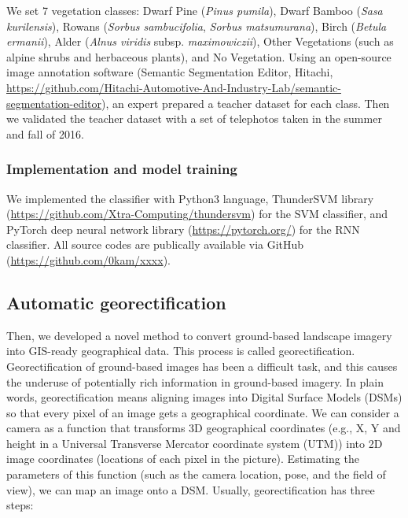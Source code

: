 \documentclass{article}
\begin{document}
We set 7 vegetation classes: Dwarf Pine (\emph{Pinus pumila}), Dwarf Bamboo (\emph{Sasa kurilensis}), Rowans (\emph{Sorbus sambucifolia}, \emph{Sorbus matsumurana}), Birch (\emph{Betula ermanii}), Alder (\emph{Alnus viridis} subsp. \emph{maximowiczii}), Other Vegetations (such as alpine shrubs and herbaceous plants), and No Vegetation. Using an open-source image annotation software (Semantic Segmentation Editor, Hitachi, \url{https://github.com/Hitachi-Automotive-And-Industry-Lab/semantic-segmentation-editor}), an expert prepared a teacher dataset for each class. Then we validated the teacher dataset with a set of telephotos taken in the summer and fall of 2016.

\hypertarget{implementation-and-model-training}{%
\subsubsection{Implementation and model training}\label{implementation-and-model-training}}

We implemented the classifier with Python3 language, ThunderSVM library (\url{https://github.com/Xtra-Computing/thundersvm}) for the SVM classifier, and PyTorch deep neural network library (\url{https://pytorch.org/}) for the RNN classifier. All source codes are publically available via GitHub (\url{https://github.com/0kam/xxxx}).

\hypertarget{automatic-georectification}{%
\subsection{Automatic georectification}\label{automatic-georectification}}

Then, we developed a novel method to convert ground-based landscape imagery into GIS-ready geographical data. This process is called georectification. Georectification of ground-based images has been a difficult task, and this causes the underuse of potentially rich information in ground-based imagery. In plain words, georectification means aligning images into Digital Surface Models (DSMs) so that every pixel of an image gets a geographical coordinate. We can consider a camera as a function that transforms 3D geographical coordinates (e.g., X, Y and height in a Universal Transverse Mercator coordinate system (UTM)) into 2D image coordinates (locations of each pixel in the picture). Estimating the parameters of this function (such as the camera location, pose, and the field of view), we can map an image onto a DSM. Usually, georectification has three steps:
\end{document}
